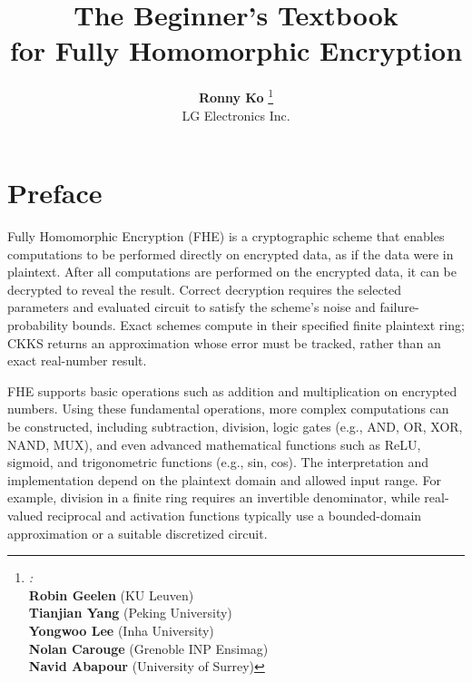 \documentclass[11pt]{article}
\begin{document}
\title{\Huge{\textbf{The Beginner's Textbook}}\\ \Huge{\textbf{for Fully Homomorphic Encryption}}}
\author{
        \textbf{Ronny Ko} \thanks{\large \textit{:}\\  
        \textbf{Robin Geelen} (KU Leuven)\\  
        \textbf{Tianjian Yang} (Peking University)\\ \textbf{Yongwoo Lee} (Inha University) \\ \textbf{Nolan Carouge} (Grenoble INP Ensimag) \\
        \textbf{Navid Abapour} (University of Surrey)
        }
        \\{LG Electronics Inc.}}%
\date{}



\begin{titlingpage}
\maketitle
\end{titlingpage}


\clearpage

\section*{Preface}
Fully Homomorphic Encryption (FHE) is a cryptographic scheme that enables computations to be performed directly on encrypted data, as if the data were in plaintext. After all computations are performed on the encrypted data, it can be decrypted to reveal the result. Correct decryption requires the selected parameters and evaluated circuit to satisfy the scheme's noise and failure-probability bounds. Exact schemes compute in their specified finite plaintext ring; CKKS returns an approximation whose error must be tracked, rather than an exact real-number result.

FHE supports basic operations such as addition and multiplication on encrypted numbers. Using these fundamental operations, more complex computations can be constructed, including subtraction, division, logic gates (e.g., AND, OR, XOR, NAND, MUX), and even advanced mathematical functions such as ReLU, sigmoid, and trigonometric functions (e.g., sin, cos). The interpretation and implementation depend on the plaintext domain and allowed input range. For example, division in a finite ring requires an invertible denominator, while real-valued reciprocal and activation functions typically use a bounded-domain approximation or a suitable discretized circuit.
\end{document}
